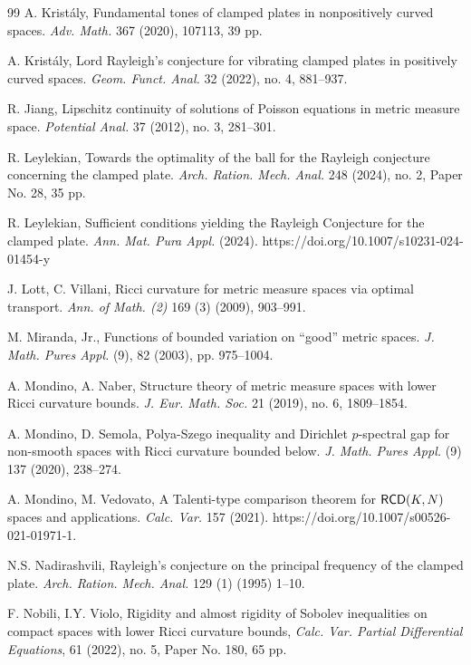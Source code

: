 \documentclass[11pt, reqno]{amsart}
\numberwithin{equation}{section}
\begin{document}
\begin{thebibliography}{99}
		 A. Kristály,  Fundamental tones of clamped plates in nonpositively curved spaces. \textit{Adv. Math.} 367 (2020), 107113, 39 pp.
		
		 A. Kristály, Lord Rayleigh's conjecture for vibrating clamped plates in positively curved spaces. \textit{Geom. Funct. Anal.} 32 (2022), no. 4, 881--937.
		
		 R. Jiang, Lipschitz continuity of solutions of Poisson equations in metric measure space. \textit{Potential Anal.} 37 (2012), no. 3, 281--301.
		
		 R. Leylekian,  Towards the optimality of the ball for the Rayleigh conjecture concerning the clamped plate. \textit{Arch. Ration. Mech. Anal.} 248 (2024), no. 2, Paper No. 28, 35 pp.
		
		 R. Leylekian,  Sufficient conditions yielding the Rayleigh Conjecture for the clamped plate. \textit{ Ann. Mat. Pura Appl.} (2024). https://doi.org/10.1007/s10231-024-01454-y
		
		  J. Lott, C. Villani, Ricci curvature for metric measure spaces via optimal transport. \textit{Ann. of Math. (2)}  169 (3) (2009), 903--991.
		
		
		
		 M. Miranda, Jr., Functions of bounded variation on ``good'' metric spaces. \textit{J. Math. Pures Appl.} (9), 82
		(2003), pp. 975--1004.
		
		 A. Mondino, A. Naber, Structure theory of metric measure spaces with lower Ricci curvature bounds. \textit{J. Eur. Math. Soc.} 21 (2019), no. 6,  1809--1854.
		
		 A. Mondino, D. Semola, 
		Polya-Szego inequality and Dirichlet $p$-spectral gap for non-smooth spaces with Ricci curvature bounded below. 
		\textit{J. Math. Pures Appl.} (9) 137 (2020), 238--274. 
		
		 A. Mondino, M. Vedovato,
		A Talenti-type comparison theorem for ${\sf RCD}(K, N)$ spaces and applications. \textit{Calc. Var.}
		157 (2021). https://doi.org/10.1007/s00526-021-01971-1.
		
			N.S. Nadirashvili, Rayleigh's conjecture on the principal frequency of the clamped plate. \textit{Arch. Ration. Mech. Anal.} 129 (1) (1995) 1--10. 
		
		 F. Nobili, I.Y. Violo,  Rigidity and almost rigidity of Sobolev inequalities on compact spaces with lower Ricci curvature bounds,  \textit{Calc. Var. Partial Differential Equations},  61 (2022), no. 5, Paper No. 180, 65 pp.
		

\end{thebibliography}
\end{document}
